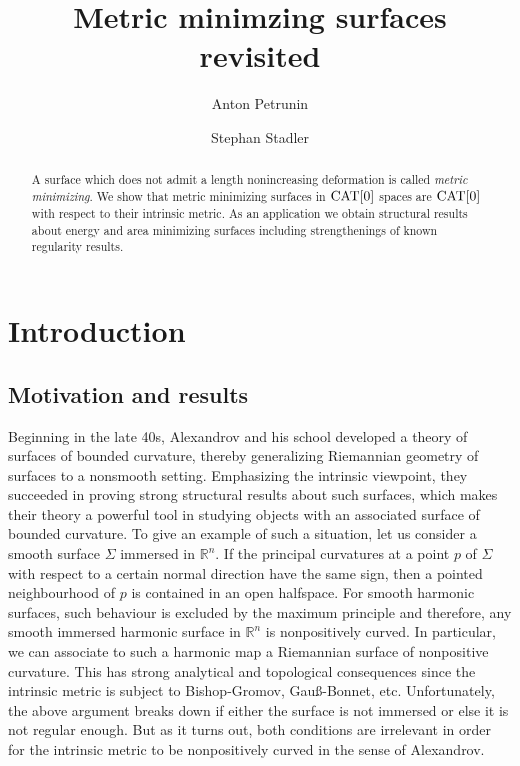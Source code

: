\documentclass[a4paper,10pt]{amsart}
\begin{document}
\title{Metric minimzing surfaces revisited}
\author{Anton Petrunin}
\address{A. Petrunin\newline\vskip-4mm
Math. Dept. PSU,
University Park, PA 16802,
USA}
\author{Stephan Stadler}
\address{S. Stadler\newline\vskip-4mm
Math. Inst.,
Universit\"at M\"unchen, Theresienstr. 39, D-80333 M\"unchen, Germany}


\date{}

\begin{abstract}
A surface which does not admit a length nonincreasing deformation is called \emph{metric minimizing}.
We show that metric minimizing surfaces in $\mathop{\rm CAT}\nolimits[0]$ spaces are $\mathop{\rm CAT}\nolimits[0]$ with respect to their intrinsic metric.
As an application we obtain structural results about energy and area minimizing surfaces including
strengthenings of known regularity results. 

\end{abstract}
\maketitle

\section{Introduction}


\subsection{Motivation and results}
Beginning in the late 40s, Alexandrov and his school developed a theory of surfaces of bounded curvature, thereby 
generalizing Riemannian geometry of surfaces to a nonsmooth setting. Emphasizing the intrinsic viewpoint, they succeeded
in proving strong structural results about such surfaces, which makes their theory a powerful tool in studying objects with an
associated surface of bounded curvature. To give an example of such a situation, let us consider a smooth surface $\Sigma$ immersed 
in $\mathbb{R}^n$.  
If the principal curvatures at a point $p$ of $\Sigma$ with respect to a certain normal direction have the same sign, then
a pointed neighbourhood of $p$ is contained in an open halfspace. For smooth harmonic surfaces, such behaviour is excluded
by the maximum principle and therefore, any smooth immersed harmonic surface in $\mathbb{R}^n$ is nonpositively curved.   
In particular, we can associate to such a harmonic map a Riemannian surface of nonpositive curvature. 
This has strong analytical and topological consequences since the intrinsic metric is subject to Bishop-Gromov, Gau\ss-Bonnet, etc. 
Unfortunately, the above argument breaks down if either the surface is not immersed or else it is not regular enough.
But as it turns out, both conditions are irrelevant in order for the intrinsic metric to be nonpositively curved in the sense of Alexandrov.
\end{document}
